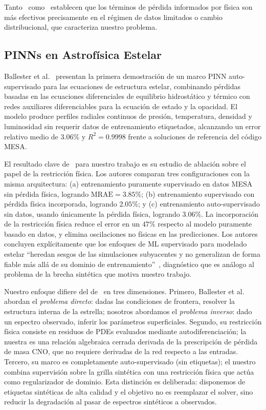 \documentclass[sigconf,ACM]{acmart}
\begin{document}
Tanto~\cite{vonRueden2021} como~\cite{Masclans2023} establecen que los términos de pérdida informados por física son más efectivos precisamente en el régimen de datos limitados o cambio distribucional, que caracteriza nuestro problema.

\subsection{PINNs en Astrofísica Estelar}
\label{subsec:pinns-astro}

Ballester et al.~\cite{Ballester2026} presentan la primera demostración de un marco PINN auto-supervisado para las ecuaciones de estructura estelar, combinando pérdidas basadas en las ecuaciones diferenciales de equilibrio hidrostático y térmico con redes auxiliares diferenciables para la ecuación de estado y la opacidad. El modelo produce perfiles radiales continuos de presión, temperatura, densidad y luminosidad sin requerir datos de entrenamiento etiquetados, alcanzando un error relativo medio de $3.06\%$ y $R^2 = 0.9998$ frente a soluciones de referencia del código MESA.

El resultado clave de~\cite{Ballester2026} para nuestro trabajo es su estudio de ablación sobre el papel de la restricción física. Los autores comparan tres configuraciones con la misma arquitectura: (a) entrenamiento puramente supervisado en datos MESA sin pérdida física, logrando $\mathrm{MRAE} = 3.85\%$; (b) entrenamiento supervisado con pérdida física incorporada, logrando $2.05\%$; y (c) entrenamiento auto-supervisado sin datos, usando únicamente la pérdida física, logrando $3.06\%$. La incorporación de la restricción física reduce el error en un $47\%$ respecto al modelo puramente basado en datos, y elimina oscilaciones no físicas en las predicciones. Los autores concluyen explícitamente que los enfoques de ML supervisado para modelado estelar ``heredan sesgos de las simulaciones subyacentes y no generalizan de forma fiable más allá de su dominio de entrenamiento''~\cite{Ballester2026}, diagnóstico que es análogo al problema de la brecha sintética que motiva nuestro trabajo.

Nuestro enfoque difiere del de~\cite{Ballester2026} en tres dimensiones. Primero, Ballester et al. abordan el \emph{problema directo}: dadas las condiciones de frontera, resolver la estructura interna de la estrella; nosotros abordamos el \emph{problema inverso}: dado un espectro observado, inferir los parámetros superficiales. Segundo, su restricción física consiste en residuos de PDEs evaluados mediante autodiferenciación; la nuestra es una relación algebraica cerrada derivada de la prescripción de pérdida de masa CNO, que no requiere derivadas de la red respecto a las entradas. Tercero, su marco es completamente auto-supervisado (sin etiquetas); el nuestro combina supervisión sobre la grilla sintética con una restricción física que actúa como regularizador de dominio. Esta distinción es deliberada: disponemos de etiquetas sintéticas de alta calidad y el objetivo no es reemplazar el solver, sino reducir la degradación al pasar de espectros sintéticos a observados.
\end{document}

